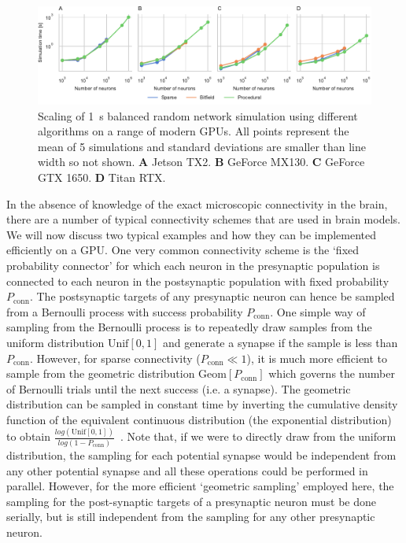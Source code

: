 \documentclass[9pt,a4paper]{amsart}
\newenvironment{fullwidth}{%
  \begin{adjustwidth}{-0.85in}{-0.85in}
}{\end{adjustwidth}}
\begin{document}
\begin{figure}
    \begin{fullwidth}
        \centering
        \includegraphics{figures/performance_scaling}
        \captionsetup{width=6.69in}
        \caption{Scaling of \SI{1}{\second} balanced random network simulation using different algorithms on a range of modern GPUs. 
        All points represent the mean of 5 simulations and standard deviations are smaller than line width so not shown.
        \textbf{A} Jetson TX2.
        \textbf{B} GeForce MX130.
        \textbf{C} GeForce GTX 1650.
        \textbf{D} Titan RTX.}
        \label{fig:performance_scaling}
    \end{fullwidth}
\end{figure}

In the absence of knowledge of the exact microscopic connectivity in the brain, there are a number of typical connectivity schemes that are used in brain models.
We will now discuss two typical examples and how they can be implemented efficiently on a GPU.
One very common connectivity scheme is the `fixed probability connector' for which each neuron in the presynaptic population is connected to each neuron in the postsynaptic population with fixed probability $P_{\text{conn}}$.
The postsynaptic targets of any presynaptic neuron can hence be sampled from a Bernoulli process with success probability $P_{\text{conn}}$.
One simple way of sampling from the Bernoulli process is to repeatedly draw samples from the uniform distribution $\text{Unif}[0, 1]$ and generate a synapse if the sample is less than $P_{\text{conn}}$.
However, for sparse connectivity ($P_{\text{conn}} \ll 1$), it is much more efficient to sample from the geometric distribution $\text{Geom}[P_{\text{conn}}]$ which governs the number of Bernoulli trials until the next success (i.e. a synapse).
The geometric distribution can be sampled in constant time by inverting the cumulative density function of the equivalent continuous distribution (the exponential distribution) to obtain $\frac{log(\text{Unif}[0, 1])}{log(1 - P_{\text{conn}})}$~\citep[p499]{DevroyeLuc2013}.
Note that, if we were to directly draw from the uniform distribution, the sampling for each potential synapse would be independent from any other potential synapse and all these operations could be performed in parallel.
However, for the more efficient `geometric sampling' employed here, the sampling for the post-synaptic targets of a presynaptic neuron must be done serially, but is still independent from the sampling for any other presynaptic neuron.
\end{document}
